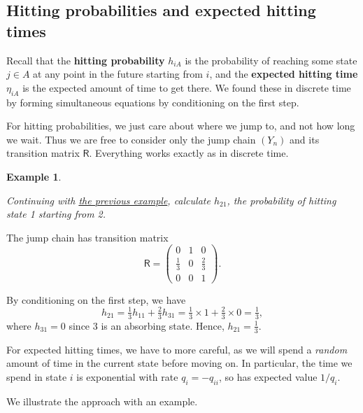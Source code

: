 \documentclass[
  a4paper,
]{article}
\theoremstyle{definition}
\theoremstyle{definition}
\newtheorem{example}{Example}[section]
\theoremstyle{definition}
\theoremstyle{remark}
\begin{document}
\hypertarget{hitting2}{%
\subsection{Hitting probabilities and expected hitting times}\label{hitting2}}

Recall that the \textbf{hitting probability} \(h_{iA}\) is the probability of reaching some state \(j \in A\) at any point in the future starting from \(i\), and the \textbf{expected hitting time} \(\eta_{iA}\) is the expected amount of time to get there. We found these in discrete time by forming simultaneous equations by conditioning on the first step.

For hitting probabilities, we just care about where we jump to, and not how long we wait. Thus we are free to consider only the jump chain \((Y_n)\) and its transition matrix \(\mathsf R\). Everything works exactly as in discrete time.

\begin{example}
\protect\hypertarget{exm:hitting-prob-jump}{}\label{exm:hitting-prob-jump}

\emph{Continuing with \protect\hyperlink{jump-classes}{the previous example}, calculate \(h_{21}\), the probability of hitting state 1 starting from 2.}

The jump chain has transition matrix
\[ \mathsf R = \begin{pmatrix} 0 & 1 & 0 \\[0.3ex] \tfrac13 & 0 & \tfrac23 \\[0.3ex] 0 & 0 & 1 \end{pmatrix} . \]

By conditioning on the first step, we have
\[ h_{21} = \tfrac13 h_{11} + \tfrac23 h_{31} = \tfrac13 \times 1 + \tfrac23 \times 0 = \tfrac13 , \]
where \(h_{31} = 0\) since 3 is an absorbing state. Hence, \(h_{21} = \frac13\).

\end{example}

For expected hitting times, we have to more careful, as we will spend a \emph{random} amount of time in the current state before moving on. In particular, the time we spend in state \(i\) is exponential with rate \(q_i = -q_{ii}\), so has expected value \(1/q_i\).

We illustrate the approach with an example.
\end{document}
